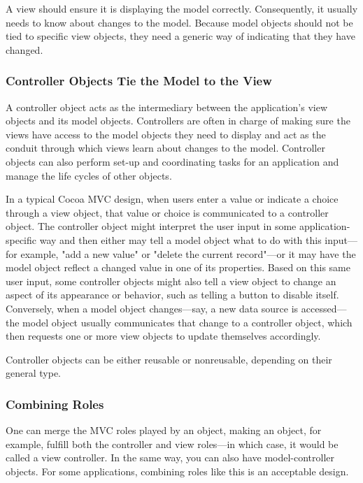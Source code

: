 A view should ensure it is displaying the model correctly. Consequently, it
usually needs to know about changes to the model. Because model objects should
not be tied to specific view objects, they need a generic way of indicating that
they have changed.

\subsubsection{Controller Objects Tie the Model to the View}

A controller object acts as the intermediary between the application's view
objects and its model objects. Controllers are often in charge of making sure
the views have access to the model objects they need to display and act as the
conduit through which views learn about changes to the model. Controller objects
can also perform set-up and coordinating tasks for an application and manage the
life cycles of other objects.

In a typical Cocoa MVC design, when users enter a value or indicate a choice
through a view object, that value or choice is communicated to a controller
object. The controller object might interpret the user input in some
application-specific way and then either may tell a model object what to do with
this input—for example, "add a new value" or "delete the current record"—or it
may have the model object reflect a changed value in one of its properties.
Based on this same user input, some controller objects might also tell a view
object to change an aspect of its appearance or behavior, such as telling a
button to disable itself. Conversely, when a model object changes—say, a new
data source is accessed—the model object usually communicates that change to a
controller object, which then requests one or more view objects to update
themselves accordingly.

Controller objects can be either reusable or nonreusable, depending on their
general type.

\subsubsection{Combining Roles}

One can merge the MVC roles played by an object, making an object, for example,
fulfill both the controller and view roles—in which case, it would be called a
view controller. In the same way, you can also have model-controller objects.
For some applications, combining roles like this is an acceptable design.

